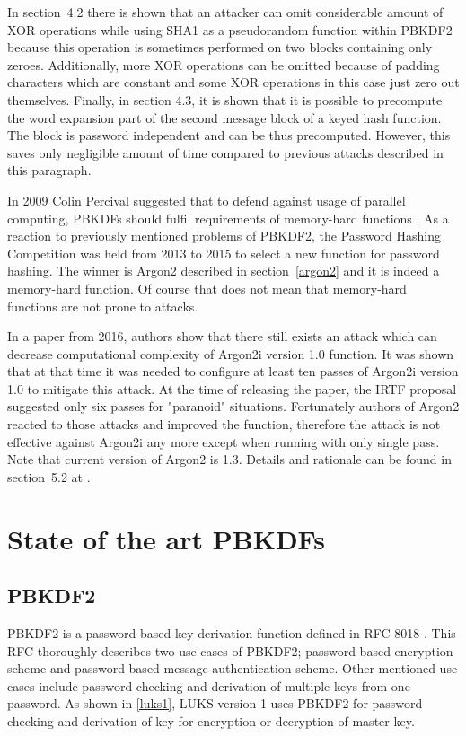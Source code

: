 \documentclass[nolof,digital]{fithesis3}
\begin{document}
In section~4.2 \parencite{pbkdf2weakness} there is shown that an attacker can omit considerable amount of XOR operations while using SHA1 as a pseudorandom function within PBKDF2 because this operation is sometimes performed on two blocks containing only zeroes. Additionally, more XOR operations can be omitted because of padding characters which are constant and some XOR operations in this case just zero out themselves. Finally, in section 4.3, it is shown that it is possible to precompute the word expansion part of the second message block of a keyed hash function. The block is password independent and can be thus precomputed. However, this saves only negligible amount of time compared to previous attacks described in this paragraph.

In 2009 Colin Percival suggested that to defend against usage of parallel computing, PBKDFs should fulfil requirements of memory-hard functions \parencite{memoryhard}. As a reaction to previously mentioned problems of PBKDF2, the Password Hashing Competition was held from 2013 to 2015 to select a new function for password hashing. The winner is Argon2 described in section~\ref{argon2} and it is indeed a memory-hard function. Of course that does not mean that memory-hard functions are not prone to attacks.

In a paper from 2016, authors show that there still exists an attack which can decrease computational complexity of Argon2i version 1.0 function. It was shown that at that time it was needed to configure at least ten passes of Argon2i version 1.0 to mitigate this attack. At the time of releasing the paper, the IRTF proposal suggested only six passes for "paranoid" situations. Fortunately authors of Argon2 reacted to those attacks and improved the function, therefore the attack is not effective against Argon2i any more except when running with only single pass. Note that current  version of Argon2 is 1.3. Details and rationale can be found in section~5.2 at \parencite{argon2}.

\chapter{State of the art PBKDFs}
\label{chap:pbkdfs}

\section{PBKDF2}
\label{sec:pbkdf2}
PBKDF2 is a password-based key derivation function defined in RFC 8018 \parencite{rfc8018}. This RFC thoroughly describes two use cases of PBKDF2; password-based encryption scheme and password-based message authentication scheme. Other mentioned use cases include password checking and derivation of multiple keys from one password. As shown in \ref{luks1}, LUKS version 1 uses PBKDF2 for password checking and derivation of key for encryption or decryption of master key.
\end{document}
